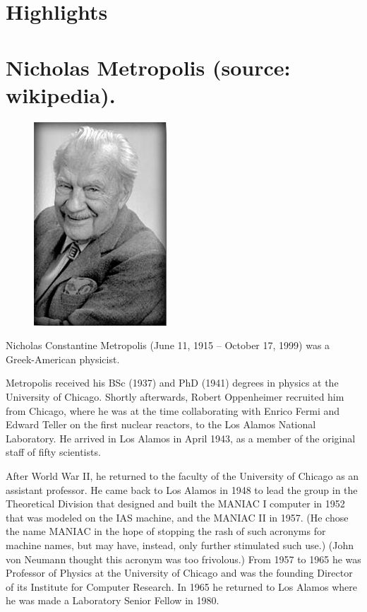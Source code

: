 \documentclass[english,graybox,envcountchap,envcountsame,sectrefs,shortlabels]{svmono}
\theoremstyle{style}
\begin{document}
\begin{subappendices}

\section*{Highlights}


\section{Nicholas Metropolis (source: wikipedia).}

\begin{figure} \centering

\includegraphics[scale=0.5]{metropolis}

\end{figure} Nicholas Constantine Metropolis (June 11, 1915 -- October 17, 1999)
was a Greek-American physicist.

Metropolis received his BSc (1937) and PhD (1941) degrees in physics
at the University of Chicago. Shortly afterwards, Robert Oppenheimer
recruited him from Chicago, where he was at the time collaborating
with Enrico Fermi and Edward Teller on the first nuclear reactors,
to the Los Alamos National Laboratory. He arrived in Los Alamos in
April 1943, as a member of the original staff of fifty scientists.

After World War II, he returned to the faculty of the University of
Chicago as an assistant professor. He came back to Los Alamos in 1948
to lead the group in the Theoretical Division that designed and built
the MANIAC I computer in 1952 that was modeled on the IAS machine,
and the MANIAC II in 1957. (He chose the name MANIAC in the hope of
stopping the rash of such acronyms for machine names, but may have,
instead, only further stimulated such use.) (John von Neumann thought
this acronym was too frivolous.) From 1957 to 1965 he was Professor
of Physics at the University of Chicago and was the founding Director
of its Institute for Computer Research. In 1965 he returned to Los
Alamos where he was made a Laboratory Senior Fellow in 1980.


\end{subappendices}
\end{document}
